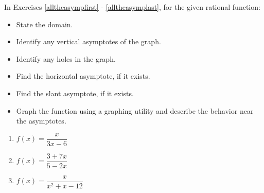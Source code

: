 \documentclass{ximera}
\begin{document}
\begin{multicols}{2}
\begin{enumerate}
\setcounter{HW}{\value{enumi}}

\end{enumerate}

\end{multicols}



In Exercises \ref{alltheasympfirst} - \ref{alltheasymplast}, for the given rational function:

\begin{multicols}{2}
\begin{itemize}

\item State the domain.
\item Identify any vertical asymptotes of the graph.

\end{itemize}
\end{multicols}

\begin{multicols}{2}
\begin{itemize}

\item Identify any holes in the graph.
\item Find the horizontal asymptote, if it exists.

\end{itemize}
\end{multicols}

\begin{multicols}{2}
\begin{itemize}

\item Find the slant asymptote, if it exists.
\item Graph the function using a graphing utility and describe the behavior near the asymptotes.

\end{itemize}
\end{multicols}

\begin{multicols}{3}
\begin{enumerate}
\setcounter{enumi}{\value{HW}}

\item $f(x) = \dfrac{x}{3x - 6}$ \label{alltheasympfirst}
\item $f(x) = \dfrac{3 + 7x}{5 - 2x}$
\item $f(x) = \dfrac{x}{x^{2} + x - 12}$

\setcounter{HW}{\value{enumi}}
\end{enumerate}
\end{multicols}
\end{document}

